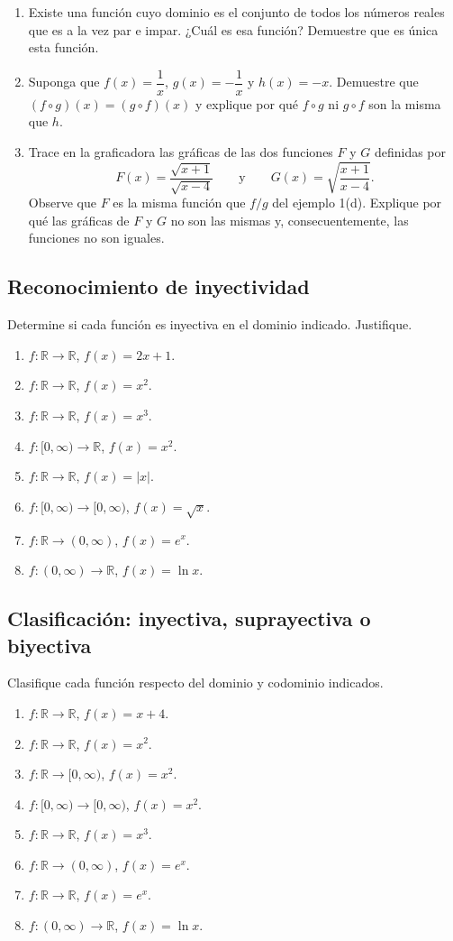 \documentclass[12pt]{article}
\theoremstyle{remark}
\begin{document}
\begin{enumerate}[start=46]
\item Existe una función cuyo dominio es el conjunto de todos los números reales que es a la vez par e impar. ¿Cuál es esa función? Demuestre que es única esta función.
\item Suponga que $f(x)=\dfrac1x$, $g(x)=-\dfrac1x$ y $h(x)=-x$. Demuestre que $(f\circ g)(x)=(g\circ f)(x)$ y explique por qué $f\circ g$ ni $g\circ f$ son la misma que $h$.
\item Trace en la graficadora las gráficas de las dos funciones $F$ y $G$ definidas por
\[
F(x)=\frac{\sqrt{x+1}}{\sqrt{x-4}}
\qquad\text{y}\qquad
G(x)=\sqrt{\frac{x+1}{x-4}}.
\]
Observe que $F$ es la misma función que $f/g$ del ejemplo 1(d). Explique por qué las gráficas de $F$ y $G$ no son las mismas y, consecuentemente, las funciones no son iguales.
\end{enumerate}


\subsection*{Reconocimiento de inyectividad}

Determine si cada función es inyectiva en el dominio indicado. Justifique.
\begin{enumerate}
\item $f:\mathbb R\to\mathbb R$, $f(x)=2x+1$.
\item $f:\mathbb R\to\mathbb R$, $f(x)=x^2$.
\item $f:\mathbb R\to\mathbb R$, $f(x)=x^3$.
\item $f:[0,\infty)\to\mathbb R$, $f(x)=x^2$.
\item $f:\mathbb R\to\mathbb R$, $f(x)=|x|$.
\item $f:[0,\infty)\to[0,\infty)$, $f(x)=\sqrt{x}$.
\item $f:\mathbb R\to(0,\infty)$, $f(x)=e^x$.
\item $f:(0,\infty)\to\mathbb R$, $f(x)=\ln x$.
\end{enumerate}

\subsection*{Clasificación: inyectiva, suprayectiva o biyectiva}
Clasifique cada función respecto del dominio y codominio indicados.
\begin{enumerate}
\item $f:\mathbb R\to\mathbb R$, $f(x)=x+4$.
\item $f:\mathbb R\to\mathbb R$, $f(x)=x^2$.
\item $f:\mathbb R\to[0,\infty)$, $f(x)=x^2$.
\item $f:[0,\infty)\to[0,\infty)$, $f(x)=x^2$.
\item $f:\mathbb R\to\mathbb R$, $f(x)=x^3$.
\item $f:\mathbb R\to(0,\infty)$, $f(x)=e^x$.
\item $f:\mathbb R\to\mathbb R$, $f(x)=e^x$.
\item $f:(0,\infty)\to\mathbb R$, $f(x)=\ln x$.
\end{enumerate}
\end{document}
